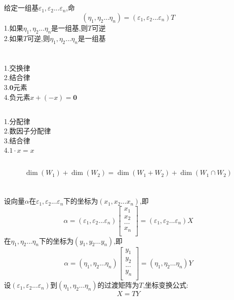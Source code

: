 \documentclass[11pt, a4paper, UTF8]{ctexart}
\begin{document}
\subsection{}
给定一组基$\varepsilon_1,\varepsilon_2...\varepsilon_n$,命
\[(\eta_1,\eta_2...\eta_n)=(\varepsilon_1,\varepsilon_2...\varepsilon_n)T\]
1.如果$\eta_1,\eta_2...\eta_n$是一组基,则$T$可逆\\
2.如果$T$可逆,则$\eta_1,\eta_2...\eta_n$是一组基
\section{}
\subsection{}
1.交换律\\
2.结合律\\
3.$\bm0$元素\\
4.负元素$x+(-x)=\bm0$\\
\subsection{}
1.分配律\\
2.数因子分配律\\
3.结合律\\
4.$1\cdot x=x$\\
\subsection{}
\[\dim(W_1)+\dim(W_2)=\dim(W_1+W_2)+\dim(W_1\cap W_2)\]
\section{}
设向量$\alpha$在$\varepsilon_1,\varepsilon_2...\varepsilon_n$下的坐标为$(x_1,x_2...x_n)$,即
\[\alpha=(\varepsilon_1,\varepsilon_2...\varepsilon_n)\begin{bmatrix}
x_1\\
x_2\\
...\\
x_n\\
\end{bmatrix}=(\varepsilon_1,\varepsilon_2...\varepsilon_n)X\]
在$\eta_1,\eta_2...\eta_n$下的坐标为$(y_1,y_2...y_n)$,即\\
\[\alpha=(\eta_1,\eta_2...\eta_n)\begin{bmatrix}
y_1\\
y_2\\
...\\
y_n\\
\end{bmatrix}=(\eta_1,\eta_2...\eta_n)Y\]
设$(\varepsilon_1,\varepsilon_2...\varepsilon_n)$到$(\eta_1,\eta_2...\eta_n)$的过渡矩阵为$T$,坐标变换公式:
\[X=TY\]
\end{document}
